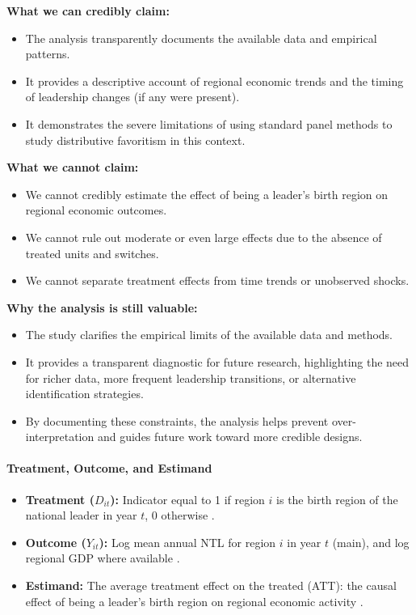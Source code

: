 \documentclass[12pt,a4paper]{article}
\begin{document}
\textbf{What we can credibly claim:}
\begin{itemize}
	\item The analysis transparently documents the available data and empirical patterns.
	\item It provides a descriptive account of regional economic trends and the timing of leadership changes (if any were present).
	\item It demonstrates the severe limitations of using standard panel methods to study distributive favoritism in this context.
\end{itemize}

\textbf{What we cannot claim:}
\begin{itemize}
	\item We cannot credibly estimate the effect of being a leader’s birth region on regional economic outcomes.
	\item We cannot rule out moderate or even large effects due to the absence of treated units and switches.
	\item We cannot separate treatment effects from time trends or unobserved shocks.
\end{itemize}

\textbf{Why the analysis is still valuable:}
\begin{itemize}
	\item The study clarifies the empirical limits of the available data and methods.
	\item It provides a transparent diagnostic for future research, highlighting the need for richer data, more frequent leadership transitions, or alternative identification strategies.
	\item By documenting these constraints, the analysis helps prevent over-interpretation and guides future work toward more credible designs.
\end{itemize}

\paragraph{Treatment, Outcome, and Estimand}
\begin{itemize}
	\item \textbf{Treatment ($D_{it}$):} Indicator equal to 1 if region $i$ is the birth region of the national leader in year $t$, 0 otherwise \citep{Hodler2014}.
	\item \textbf{Outcome ($Y_{it}$):} Log mean annual NTL for region $i$ in year $t$ (main), and log regional GDP where available \citep{Gibson2021, Bickenbach2016,WorldBank2024}.
	\item \textbf{Estimand:} The average treatment effect on the treated (ATT): the causal effect of being a leader’s birth region on regional economic activity \citep{Imbens2015}.
\end{itemize}
\end{document}
